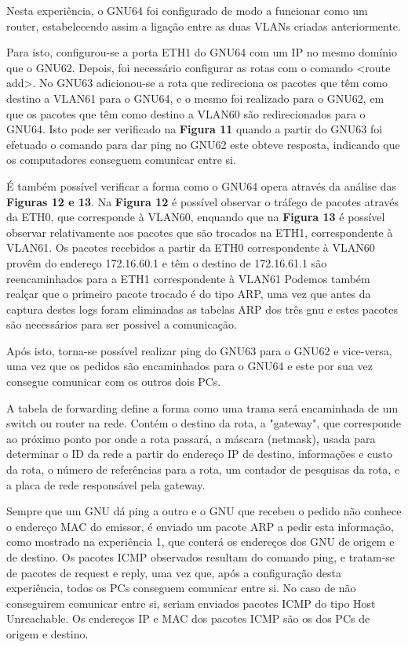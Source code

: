 \documentclass[article, a4paper, 11pt, oneside]{memoir}
\begin{document}
Nesta experiência, o GNU64 foi configurado de modo a funcionar como um router, estabelecendo assim a ligação entre as duas VLANs criadas anteriormente.

Para isto, configurou-se a porta ETH1 do GNU64 com um IP no mesmo domínio que o GNU62. Depois, foi necessário configurar as rotas com o comando <route add>. 
No GNU63 adicionou-se a rota que redireciona os pacotes que têm como destino a VLAN61 para o GNU64, 
e o mesmo foi realizado para o GNU62, em que os pacotes que têm como destino a VLAN60 são redirecionados para o GNU64.
Isto pode ser verificado na \textbf{Figura 11} quando a partir do GNU63 foi efetuado o comando para dar ping no GNU62 este obteve resposta, 
indicando que os computadores conseguem comunicar entre si.

É também possível verificar a forma como o GNU64 opera através da análise das \textbf{Figuras 12 e 13}. Na \textbf{Figura 12} é possível observar o tráfego de 
pacotes através da ETH0, 
que corresponde à VLAN60, enquando que na \textbf{Figura 13} é possível observar relativamente aos pacotes que são trocados na ETH1, correspondente à VLAN61. 
Os pacotes recebidos a partir da
ETH0 correspondente à VLAN60 provêm do endereço 172.16.60.1 e têm o destino de 172.16.61.1 são reencaminhados para a ETH1 correspondente à VLAN61
Podemos também realçar que o primeiro pacote trocado é do tipo ARP, uma vez que antes da captura destes logs foram eliminadas as tabelas ARP dos três gnu e estes pacotes são necessários
para ser possivel a comunicação.

Após isto, torna-se possível realizar ping do GNU63 para o GNU62 e vice-versa, uma vez que os pedidos são encaminhados para o GNU64 e este por sua vez consegue comunicar com os outros dois PCs.

A tabela de forwarding define a forma como uma trama será encaminhada de um switch ou router na rede. Contém o destino da rota, a "gateway", que corresponde 
ao próximo ponto por onde a rota passará,
a máscara (netmask), usada para determinar o ID da rede a partir do endereço IP de destino, 
informações e custo da rota, o número de referências para a rota, 
um contador de pesquisas da rota, e a placa de rede responsável pela gateway.

Sempre que um GNU dá ping a outro e o GNU que recebeu o pedido não conhece o endereço MAC do emissor, é enviado um pacote ARP a pedir esta informação, 
como mostrado na experiência 1, que conterá os endereços dos GNU de origem e de destino.
Os pacotes ICMP observados resultam do comando ping, e tratam-se de pacotes de request e reply, uma vez que, após a configuração desta experiência, 
todos os PCs conseguem comunicar entre si.
No caso de não conseguirem comunicar entre si, seriam enviados pacotes ICMP do tipo Host Unreachable.
Os endereços IP e MAC dos pacotes ICMP são os dos PCs de origem e destino.
\end{document}

